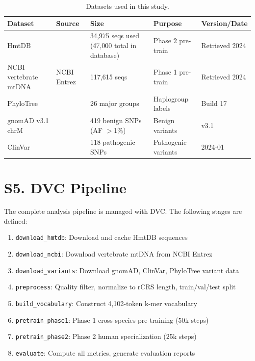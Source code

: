 \documentclass[10pt]{article}
\begin{document}
\begin{table}[h]
\centering
\caption{Datasets used in this study.}
\begin{tabular}{lllll}
\toprule
\textbf{Dataset} & \textbf{Source} & \textbf{Size} & \textbf{Purpose} & \textbf{Version/Date} \\
\midrule
HmtDB & \citet{clima2017hmtdb} & 34,975 seqs used (47,000 total in database) & Phase 2 pre-train & Retrieved 2024 \\
NCBI vertebrate mtDNA & NCBI Entrez & 117,615 seqs & Phase 1 pre-train & Retrieved 2024 \\
PhyloTree & \citet{vanoven2009phylotree} & 26 major groups & Haplogroup labels & Build 17 \\
gnomAD v3.1 chrM & \citet{karczewski2020gnomad} & 419 benign SNPs (AF $>$1\%) & Benign variants & v3.1 \\
ClinVar & \citet{landrum2018clinvar} & 118 pathogenic SNPs & Pathogenic variants & 2024-01 \\
\bottomrule
\end{tabular}
\end{table}

\section*{S5. DVC Pipeline}

The complete analysis pipeline is managed with DVC. The following stages are defined:

\begin{enumerate}
\item \texttt{download\_hmtdb}: Download and cache HmtDB sequences
\item \texttt{download\_ncbi}: Download vertebrate mtDNA from NCBI Entrez
\item \texttt{download\_variants}: Download gnomAD, ClinVar, PhyloTree variant data
\item \texttt{preprocess}: Quality filter, normalize to rCRS length, train/val/test split
\item \texttt{build\_vocabulary}: Construct 4,102-token k-mer vocabulary
\item \texttt{pretrain\_phase1}: Phase 1 cross-species pre-training (50k steps)
\item \texttt{pretrain\_phase2}: Phase 2 human specialization (25k steps)
\item \texttt{evaluate}: Compute all metrics, generate evaluation reports
\end{enumerate}
\end{document}
